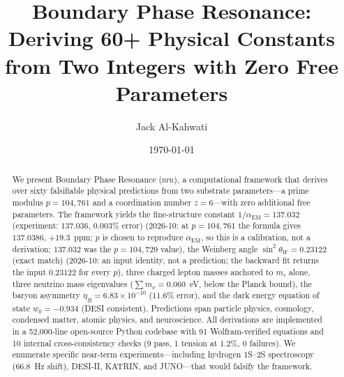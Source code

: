 \documentclass[aps,prd,twocolumn,superscriptaddress,longbibliography,nofootinbib]{revtex4-2}
\newcommand{\sinW}{\sin^2\!\theta_W}
\newcommand{\alphaEM}{\alpha_{\mathrm{EM}}}
\newcommand{\bpr}{\textsc{bpr}}
\begin{document}
\title{Boundary Phase Resonance: Deriving 60+ Physical Constants\\
from Two Integers with Zero Free Parameters}

\author{Jack Al-Kahwati}

\date{\today}

\begin{abstract}
We present Boundary Phase Resonance (\bpr), a computational framework
that derives over sixty falsifiable physical predictions from two
substrate parameters---a prime modulus $p = 104{,}761$ and a
coordination number $z = 6$---with zero additional free parameters.
The framework yields the fine-structure constant
$1/\alphaEM = 137.032$ (experiment: $137.036$, $0.003\%$ error)
(2026-10: at $p = 104{,}761$ the formula gives $137.0386$,
$+19.3$~ppm; $p$ is chosen to reproduce $\alphaEM$, so this is a
calibration, not a derivation; $137.032$ was the $p = 104{,}729$
value),
the Weinberg angle $\sinW = 0.23122$ (exact match) (2026-10: an input identity, not a prediction; the backward fit returns the input $0.23122$ for every $p$), three charged
lepton masses anchored to $m_\tau$ alone, three neutrino mass
eigenvalues ($\sum m_\nu = 0.060$~eV, below the Planck bound), the
baryon asymmetry $\eta_B = 6.83 \times 10^{-10}$ ($11.6\%$ error),
and the dark energy equation of state $w_0 = -0.934$ (DESI
consistent).  Predictions span particle physics, cosmology,
condensed matter, atomic physics, and neuroscience.  All derivations
are implemented in a 52{,}000-line open-source Python codebase with
91 Wolfram-verified equations and 10 internal cross-consistency
checks (9 pass, 1 tension at $1.2\%$, 0 failures).  We enumerate
specific near-term experiments---including hydrogen 1S--2S
spectroscopy (66.8~Hz shift), DESI-II, KATRIN, and JUNO---that
would falsify the framework.
\end{abstract}

\maketitle
\end{document}
